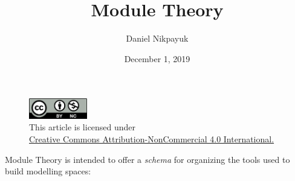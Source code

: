 \documentclass[twoside]{article}
\title{Module Theory}
\author{Daniel Nikpayuk}
\date{December 1, 2019}
\begin{document}
\maketitle
\thispagestyle{empty}

\begin{figure}[h]
\centering
\includegraphics[width=1in]{../../../cc-by-nc.png}\\[0.1in]
\tiny This article is licensed under \\
\href{http://creativecommons.org/licenses/by-nc/4.0/}
{Creative Commons Attribution-NonCommercial 4.0 International.}\\[0.3in]
\end{figure}

Module Theory is intended to offer a \emph{schema} for organizing the tools used to build modelling spaces:\\[0.25cm]
\end{document}
